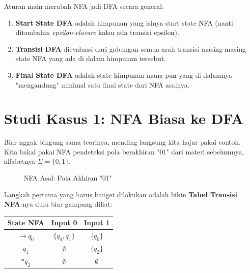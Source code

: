 \documentclass[12pt,a4paper]{article}
\begin{document}
Aturan main merubah NFA jadi DFA secara general:
\begin{enumerate}
    \item \textbf{Start State DFA} adalah himpunan yang isinya start state NFA (nanti ditambahin \textit{epsilon-closure} kalau ada transisi epsilon).
    \item \textbf{Transisi DFA} dievaluasi dari gabungan semua arah transisi masing-masing state NFA yang ada di dalam himpunan tersebut.
    \item \textbf{Final State DFA} adalah state himpunan mana pun yang di dalamnya "mengandung" minimal satu final state dari NFA asalnya.
\end{enumerate}

\newpage
\section{Studi Kasus 1: NFA Biasa ke DFA}

Biar nggak bingung sama teorinya, mending langsung kita hajar pakai contoh. Kita bakal pakai NFA pendeteksi pola berakhiran "01" dari materi sebelumnya, alfabetnya $\Sigma=\{0,1\}$.

\begin{figure}[h]
    \centering
    \caption{NFA Asal: Pola Akhiran "01"}
\end{figure}

Langkah pertama yang harus banget dilakukan adalah bikin \textbf{Tabel Transisi NFA}-nya dulu biar gampang diliat:

\begin{table}[h]
\centering
\begin{tabular}{@{}ccc@{}}
\toprule
\textbf{State NFA} & \textbf{Input 0} & \textbf{Input 1} \\ \midrule
$\rightarrow q_0$ & $\{q_0, q_1\}$ & $\{q_0\}$ \\
$q_1$ & $\emptyset$ & $\{q_2\}$ \\
$*q_2$ & $\emptyset$ & $\emptyset$ \\ \bottomrule
\end{tabular}
\end{table}
\end{document}
